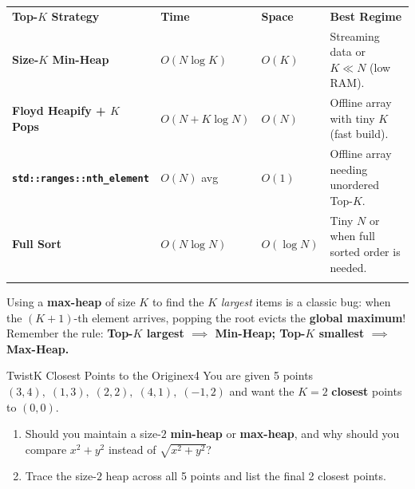 \documentclass[11pt,a4paper]{article}
\theoremstyle{definition}
\begin{document}
\begingroup\footnotesize{}
\begin{tabularx}{\textwidth}{>{\raggedright\arraybackslash\bfseries}p{4.3cm} >{\centering\arraybackslash}p{2.2cm} >{\centering\arraybackslash}p{1.5cm} >{\raggedright\arraybackslash}X}
\arrayrulecolor{primaryblue}\toprule[1.2pt]
\rowcolor{primaryblue!10}
\textcolor{primaryblue}{\textbf{Top-$K$ Strategy}} & \textcolor{primaryblue}{\textbf{Time}} & \textcolor{primaryblue}{\textbf{Space}} & \textcolor{primaryblue}{\textbf{Best Regime}} \\
\arrayrulecolor{codeframe}\midrule[0.6pt]
Size-$K$ Min-Heap & $O(N \log K)$ & $O(K)$ & Streaming data or $K \ll N$ (low RAM). \\
Floyd Heapify + $K$ Pops & $O(N + K \log N)$ & $O(N)$ & Offline array with tiny $K$ (fast build). \\
\texttt{std::ranges::nth\_element} & $O(N)$ avg & $O(1)$ & Offline array needing unordered Top-$K$. \\
Full Sort & $O(N \log N)$ & $O(\log N)$ & Tiny $N$ or when full sorted order is needed. \\
\arrayrulecolor{primaryblue}\bottomrule[1.2pt]
\end{tabularx}\endgroup

\begin{watchoutbox}
Using a \textbf{max-heap} of size $K$ to find the $K$ \emph{largest} items is a classic bug: when the $(K+1)$-th element arrives, popping the root evicts the \textbf{global maximum}! Remember the rule: \textbf{Top-$K$ largest $\implies$ Min-Heap; Top-$K$ smallest $\implies$ Max-Heap.}
\end{watchoutbox}

\begin{tryitbox}{Twist}{K Closest Points to the Origin}{ex4}
You are given 5 points $(3, 4),\; (1, 3),\; (2, 2),\; (4, 1),\; (-1, 2)$ and want the $K = 2$ \textbf{closest} points to $(0, 0)$.
\begin{enumerate}[itemsep=1pt, topsep=2pt]
    \item Should you maintain a size-$2$ \textbf{min-heap} or \textbf{max-heap}, and why should you compare $x^2 + y^2$ instead of $\sqrt{x^2 + y^2}$?
    \item Trace the size-$2$ heap across all 5 points and list the final 2 closest points.
\end{enumerate}
\end{tryitbox}

\end{document}
